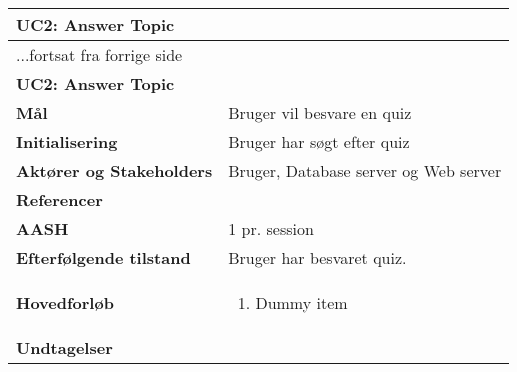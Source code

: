 \begin{center} \centering \label{ucAnswerTopic}
	\begin{longtable}{|p{4.6cm}|p{9.4cm}|}  %
		\hline
		\multicolumn{2}{|l|}{\textbf{UC2: Answer Topic}} \\\hline
		\endfirsthead
		
		\multicolumn{2}{l}{...fortsat fra forrige side} \\ \hline %
		\multicolumn{2}{|l|}{\textbf{UC2: Answer Topic}} \\\hline
		\endhead	
		
		\textbf{Mål}						&Bruger vil besvare en quiz
		\\\hline
		\textbf{Initialisering}			&Bruger har søgt efter quiz
		\\\hline
		\textbf{Aktører og Stakeholders}	&Bruger, Database server og Web server
		\\\hline 
		\textbf{Referencer}				&
		\\\hline
		\textbf{AASH}					&1 pr. session
		\\\hline
		\textbf{Efterfølgende tilstand}	&Bruger har besvaret quiz.
		\\\hline
		\textbf{Hovedforløb}					
			&\begin{enumerate}
				
				\item Dummy item
			\end{enumerate}\\\hline
		\textbf{Undtagelser}
			&			
			\\\hline
	\end{longtable} 
\end{center}